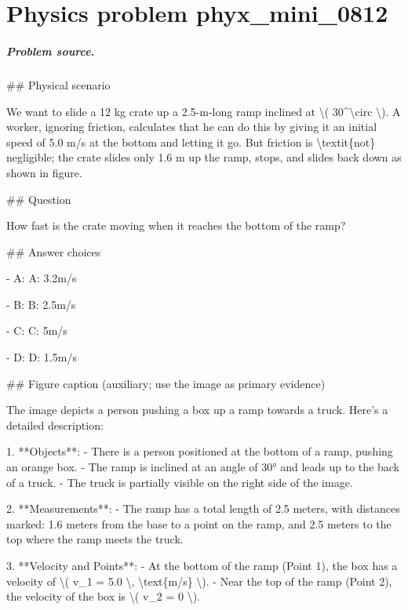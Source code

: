 
\chapter{Physics problem phyx\_mini\_0812}
\label{ch:PhyXMiniProblems_problem_phyx_mini_0812}

\paragraph{Problem source.}
\#\# Physical scenario

We want to slide a 12 kg crate up a 2.5-m-long ramp inclined at \textbackslash{}( 30\textasciicircum{}\textbackslash{}circ \textbackslash{}). A worker, ignoring friction, calculates that he can do this by giving it an initial speed of 5.0 m/s at the bottom and letting it go. But friction is \textbackslash{}textit\{not\} negligible; the crate slides only 1.6 m up the ramp, stops, and slides back down as shown in figure.

\#\# Question

How fast is the crate moving when it reaches the bottom of the ramp?

\#\# Answer choices

- A: A: 3.2m/s

- B: B: 2.5m/s

- C: C: 5m/s

- D: D: 1.5m/s

\#\# Figure caption (auxiliary; use the image as primary evidence)

The image depicts a person pushing a box up a ramp towards a truck. Here's a detailed description:

1. **Objects**:
   - There is a person positioned at the bottom of a ramp, pushing an orange box.
   - The ramp is inclined at an angle of 30° and leads up to the back of a truck.
   - The truck is partially visible on the right side of the image.

2. **Measurements**:
   - The ramp has a total length of 2.5 meters, with distances marked: 1.6 meters from the base to a point on the ramp, and 2.5 meters to the top where the ramp meets the truck.

3. **Velocity and Points**:
   - At the bottom of the ramp (Point 1), the box has a velocity of \textbackslash{}( v\_1 = 5.0 \textbackslash{}, \textbackslash{}text\{m/s\} \textbackslash{}).
   - Near the top of the ramp (Point 2), the velocity of the box is \textbackslash{}( v\_2 = 0 \textbackslash{}).

